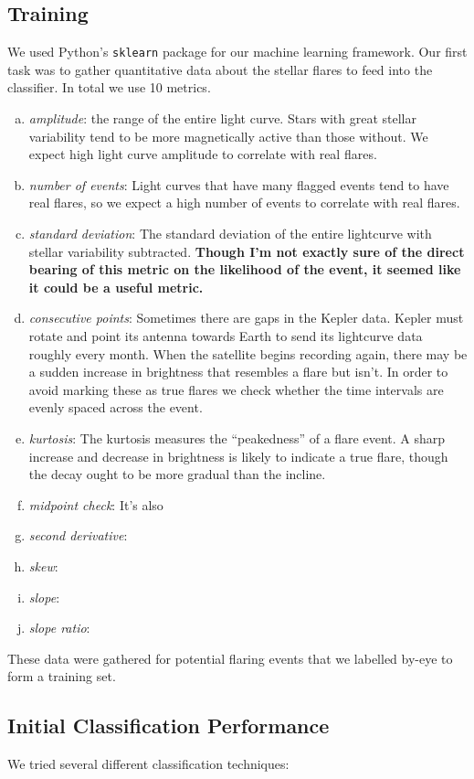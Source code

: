 \documentclass[11pt]{article}
\begin{document}
\subsection{Training}
\label{sec:train}
We used Python's \verb|sklearn| package for our machine learning
framework.  Our first task was to gather quantitative data about the
stellar flares to feed into the classifier.  In total we use 10
metrics.
\begin{enumerate}[(a)]
\item \emph{amplitude}: the range of the entire light curve.  Stars
  with great stellar variability tend to be more magnetically active
  than those without.  We expect high light curve amplitude to
  correlate with real flares.
\item \emph{number of events}: Light curves that have many flagged
  events tend to have real flares, so we expect a high number of
  events to correlate with real flares.
\item \emph{standard deviation}: The standard deviation of the entire
  lightcurve with stellar variability subtracted.  \textbf{Though I'm not
  exactly sure of the direct bearing of this metric on the likelihood
  of the event, it seemed like it could be a useful metric.}
\item \emph{consecutive points}: Sometimes there are gaps in the
  Kepler data.  Kepler must rotate and point its antenna towards Earth
  to send its lightcurve data roughly every month.  When the satellite
  begins recording again, there may be a sudden increase in brightness
  that resembles a flare but isn't.  In order to avoid marking these
  as true flares we check whether the time intervals are evenly spaced
  across the event.
\item \emph{kurtosis}: The kurtosis measures the ``peakedness'' of a
  flare event.  A sharp increase and decrease in brightness is likely
  to indicate a true flare, though the decay ought to be more gradual
  than the incline.
\item \emph{midpoint check}: It's also 
\item \emph{second derivative}:
\item \emph{skew}:
\item \emph{slope}:
\item \emph{slope ratio}:
\end{enumerate}
These data were gathered for potential flaring events that we labelled
by-eye to form a training set.

\subsection{Initial Classification Performance}
\label{sec:class}
We tried several different classification techniques:
\end{document}
